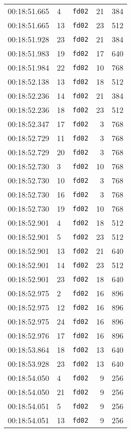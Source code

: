 \documentclass{article}
\begin{document}
\begin{longtable}{lllrr}
00:18:51.665 & 4 & \texttt{fd02} & 21 & 384 \\
00:18:51.665 & 13 & \texttt{fd02} & 23 & 512 \\
00:18:51.928 & 23 & \texttt{fd02} & 21 & 384 \\
00:18:51.983 & 19 & \texttt{fd02} & 17 & 640 \\
00:18:51.984 & 22 & \texttt{fd02} & 10 & 768 \\
00:18:52.138 & 13 & \texttt{fd02} & 18 & 512 \\
00:18:52.236 & 14 & \texttt{fd02} & 21 & 384 \\
00:18:52.236 & 18 & \texttt{fd02} & 23 & 512 \\
00:18:52.347 & 17 & \texttt{fd02} & 3 & 768 \\
00:18:52.729 & 11 & \texttt{fd02} & 3 & 768 \\
00:18:52.729 & 20 & \texttt{fd02} & 3 & 768 \\
00:18:52.730 & 3 & \texttt{fd02} & 10 & 768 \\
00:18:52.730 & 10 & \texttt{fd02} & 3 & 768 \\
00:18:52.730 & 16 & \texttt{fd02} & 3 & 768 \\
00:18:52.730 & 19 & \texttt{fd02} & 10 & 768 \\
00:18:52.901 & 4 & \texttt{fd02} & 18 & 512 \\
00:18:52.901 & 5 & \texttt{fd02} & 23 & 512 \\
00:18:52.901 & 13 & \texttt{fd02} & 21 & 640 \\
00:18:52.901 & 14 & \texttt{fd02} & 23 & 512 \\
00:18:52.901 & 23 & \texttt{fd02} & 18 & 640 \\
00:18:52.975 & 2 & \texttt{fd02} & 16 & 896 \\
00:18:52.975 & 12 & \texttt{fd02} & 16 & 896 \\
00:18:52.975 & 24 & \texttt{fd02} & 16 & 896 \\
00:18:52.976 & 17 & \texttt{fd02} & 16 & 896 \\
00:18:53.864 & 18 & \texttt{fd02} & 13 & 640 \\
00:18:53.928 & 23 & \texttt{fd02} & 13 & 640 \\
00:18:54.050 & 4 & \texttt{fd02} & 9 & 256 \\
00:18:54.050 & 21 & \texttt{fd02} & 9 & 256 \\
00:18:54.051 & 5 & \texttt{fd02} & 9 & 256 \\
00:18:54.051 & 13 & \texttt{fd02} & 9 & 256 \\

\end{longtable}
\end{document}
